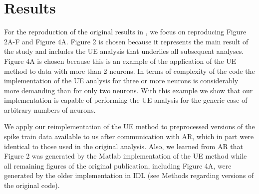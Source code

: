 \documentclass[10pt,a4paper,onecolumn]{article}
\begin{document}
\section{Results}\label{results}

For the reproduction of the original results in \autocite{Riehle97}, we
focus on reproducing Figure 2A-F and Figure 4A. Figure 2 is chosen
because it represents the main result of the study and includes the UE
analysis that underlies all subsequent analyses. Figure 4A is chosen
because this is an example of the application of the UE method to data
with more than 2 neurons. In terms of complexity of the code the
implementation of the UE analysis for three or more neurons is
considerably more demanding than for only two neurons. With this example
we show that our implementation is capable of performing the UE analysis
for the generic case of arbitrary numbers of neurons.

We apply our reimplementation of the UE method to preprocessed versions
of the spike train data available to us after communication with AR,
which in part were identical to those used in the original analysis.
Also, we learned from AR that Figure 2 was generated by the Matlab
implementation of the UE method while all remaining figures of the
original publication, including Figure 4A, were generated by the older
implementation in IDL (see Methods regarding versions of the original
code).
\end{document}
